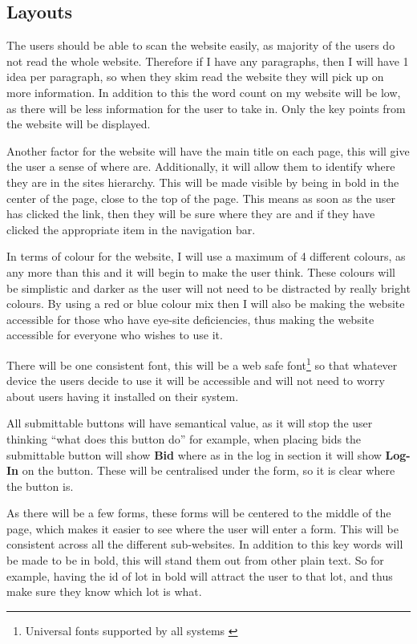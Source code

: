 \documentclass{article}
\begin{document}
\subsection{Layouts}
The users should be able to scan the website easily, as majority of the users do not read the whole website. Therefore if I have any paragraphs, then I will have 1 idea per paragraph, so when they skim read the website they will pick up on more information. In addition to this the word count on my website will be low, as there will be less information for the user to take in. Only the key points from the website will be displayed.

Another factor for the website will have the main title on each page, this will give the user a sense of where are. Additionally, it will allow them to identify where they are in the sites hierarchy.\cite{Layout} This will be made visible by being in bold in the center of the page, close to the top of the page. This means as soon as the user has clicked the link, then they will be sure where they are and if they have clicked the appropriate item in the navigation bar.

In terms of colour for the website, I will use a maximum of 4 different colours, as any more than this and it will begin to make the user think. These colours will be simplistic and darker as the user will not need to be distracted by really bright colours.\cite{colour} By using a red or blue colour mix then I will also be making the website accessible for those who have eye-site deficiencies, thus making the website accessible for everyone who wishes to use it. \cite{ColourChoice}

There will be one consistent font, this will be a web safe font\footnote{Universal fonts supported by all systems \cite{Webfont}} so that whatever device the users decide to use it will be accessible and will not need to worry about users having it installed on their system. 

All submittable buttons will have semantical value, as it will stop the user thinking ``what does this button do'' for example, when placing bids the submittable button will show \textbf{Bid} where as in the log in section it will show \textbf{Log-In} on the button. These will be centralised under the form, so it is clear where the button is.

As there will be a few forms, these forms will be centered to the middle of the page, which makes it easier to see where the user will enter a form. This will be consistent across all the different sub-websites. In addition to this key words will be made to be in bold, this will stand them out from other plain text. So for example, having the id of lot in bold will attract the user to that lot, and thus make sure they know which lot is what. 
\end{document}
